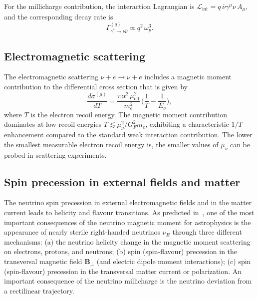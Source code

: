 \documentclass[a4paper,11pt]{article}
\begin{document}
For the millicharge contribution, the interaction Lagrangian is $\mathcal{L}_{\text{int}} = q\,\bar{\nu}\gamma^\mu\nu\,A_\mu$, and the corresponding decay rate is
\begin{equation}
\Gamma_{\gamma^* \to \nu\bar{\nu}}^{(q)} \propto q^2\,\omega_p^3.
\end{equation}

\subsection{Electromagnetic scattering}

The electromagnetic scattering $\nu + e \to \nu + e$ includes a magnetic moment contribution to the differential cross section that is given by
\begin{equation}
\label{eq:dsigma_mu}
\frac{d\sigma^{(\mu)}}{dT} = \frac{\pi\alpha^2\,\mu_{\text{eff}}^2}{m_e^2}\,\Big(\frac{1}{T} - \frac{1}{E_\nu}\Big),
\end{equation}
where $T$ is the electron recoil energy. The magnetic moment contribution dominates at low recoil energies $T \lesssim \mu_\nu^2/G_F^2 m_e$, exhibiting a characteristic $1/T$ enhancement compared to the standard weak interaction contribution. The lower the smallest measurable electron recoil energy is, the smaller values of $\mu_\nu$ can be probed in scattering experiments.

\subsection{Spin precession in external fields and matter}

The neutrino spin precession in external electromagnetic fields and in the matter current leads to helicity and flavour transitions. As predicted in~\cite{Studenikin:2004PAN}, one of the most important consequences of the neutrino magnetic moment for astrophysics is the appearance of nearly sterile right-handed neutrinos $\nu_R$ through three different mechanisms: (a) the neutrino helicity change in the magnetic moment scattering on electrons, protons, and neutrons; (b) spin (spin-flavour) precession in the transversal magnetic field $\mathbf{B}_\perp$ (and electric dipole moment interactions); (c) spin (spin-flavour) precession in the transversal matter current or polarization. An important consequence of the neutrino millicharge is the neutrino deviation from a rectilinear trajectory.


\end{document}
